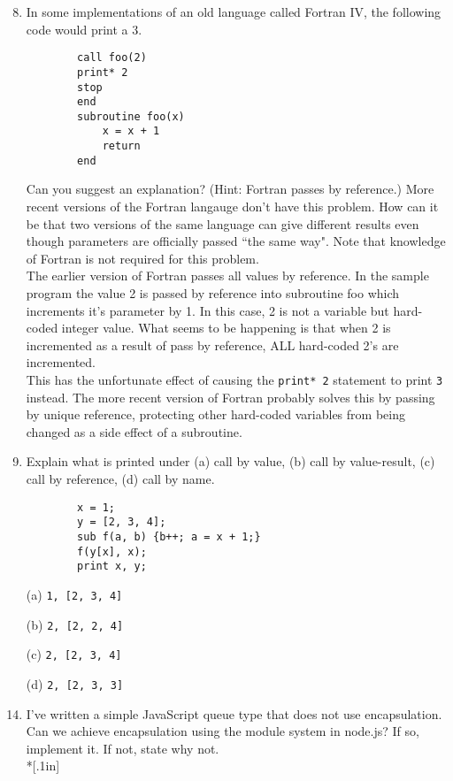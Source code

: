 \documentclass{article}
\begin{document}
\begin{enumerate}
    \setcounter{enumi}{7}
    \pagebreak
    \item In some implementations of an old language called Fortran IV, the following code would print a 3. 
    \begin{verbatim} 
        call foo(2)
        print* 2
        stop
        end
        subroutine foo(x)
            x = x + 1
            return
        end
    \end{verbatim}
    Can you suggest an explanation? (Hint: Fortran passes by reference.) More recent versions of the Fortran langauge don't have this problem. How can it be that two versions of the same language can give different results even though parameters are officially passed ``the same way". Note that knowledge of Fortran is not required for this problem.\\[.25in]
    The earlier version of Fortran passes all values by reference. In the sample program the value 2 is passed by reference into subroutine foo which increments it's parameter by 1. In this case, 2 is not a variable but hard-coded integer value. What seems to be happening is that when 2 is incremented as a result of pass by reference, ALL hard-coded 2's are incremented. \\[.1in]
    This has the unfortunate effect of causing the \texttt{print* 2} statement to print \texttt{3} instead. The more recent version of Fortran probably solves this by passing by unique reference, protecting other hard-coded variables from being changed as a side effect of a subroutine.
    \setcounter{enumi}{9}
    \pagebreak
    \item Explain what is printed under (a) call by value, (b) call by value-result, (c) call by reference, (d) call by name.
    \begin{verbatim}
        x = 1;
        y = [2, 3, 4];
        sub f(a, b) {b++; a = x + 1;}
        f(y[x], x);
        print x, y;
    \end{verbatim}
        \item[(a)]
        \texttt{1, [2, 3, 4]}
        \item[(b)]
        \texttt{2, [2, 2, 4]}
        \item[(c)]
        \texttt{2, [2, 3, 4]}
        \item[(d)]
        \texttt{2, [2, 3, 3]}
    \pagebreak
    \item I've written a simple JavaScript queue type that does not use encapsulation. Can we achieve encapsulation using the module system in node.js? If so, implement it. If not, state why not. \\*[.1in]

\end{enumerate}
\end{document}

